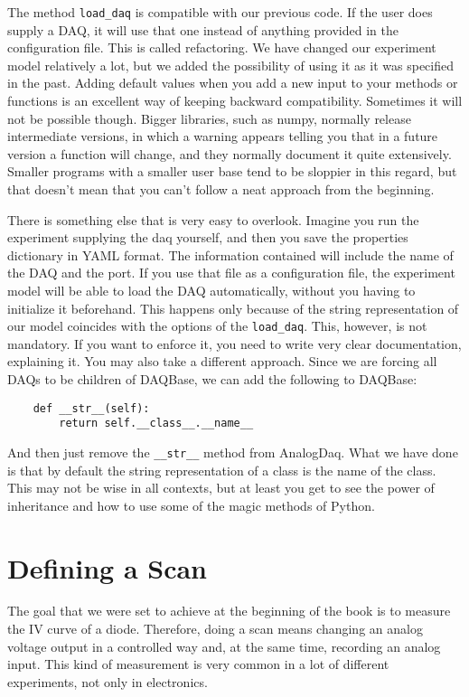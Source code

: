 {The method \texttt{load_daq} is compatible with our previous code. If the user does supply a DAQ, it will use that one instead of anything provided in the configuration file. This is called refactoring. We have changed our experiment model relatively a lot, but we added the possibility of using it as it was specified in the past. Adding default values when you add a new input to your methods or functions is an excellent way of keeping backward compatibility. Sometimes it will not be possible though. Bigger libraries, such as numpy, normally release intermediate versions, in which a warning appears telling you that in a future version a function will change, and they normally document it quite extensively. Smaller programs with a smaller user base tend to be sloppier in this regard, but that doesn't mean that you can't follow a neat approach from the beginning. 


There is something else that is very easy to overlook. Imagine you run the experiment supplying the daq yourself, and then you save the properties dictionary in YAML format. The information contained will include the name of the DAQ and the port. If you use that file as a configuration file, the experiment model will be able to load the DAQ automatically, without you having to initialize it beforehand. This happens only because of the string representation of our model coincides with the options of the \texttt{load_daq}. This, however, is not mandatory. If you want to enforce it, you need to write very clear documentation, explaining it. You may also take a different approach. Since we are forcing all DAQs to be children of DAQBase, we can add the following to DAQBase:

\begin{verbatim}
    def __str__(self):
        return self.__class__.__name__
\end{verbatim}

And then just remove the \texttt{__str__} method from AnalogDaq. What we have done is that by default the string representation of a class is the name of the class. This may not be wise in all contexts, but at least you get to see the power of inheritance and how to use some of the magic methods of Python. 

\section{Defining a Scan}\label{defining-ascan}
The goal that we were set to achieve at the beginning of the book is to measure the {IV} curve of a diode. Therefore, doing a scan means changing an analog voltage output in a controlled way and, at the same time, recording an analog input. This kind of measurement is very common in a lot of different experiments, not only in electronics.

}
